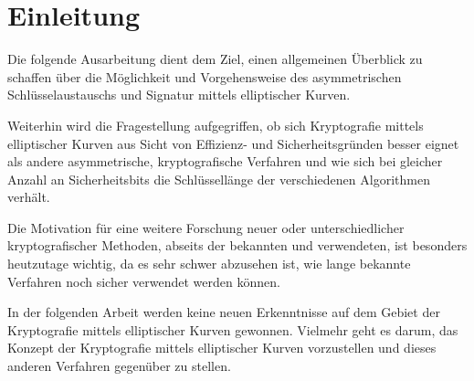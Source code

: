\chapter{Einleitung}

Die folgende Ausarbeitung dient dem Ziel, einen allgemeinen Überblick zu schaffen über 
die Möglichkeit und Vorgehensweise des asymmetrischen Schlüsselaustauschs und Signatur mittels elliptischer Kurven.

Weiterhin wird die Fragestellung aufgegriffen, ob sich Kryptografie mittels elliptischer Kurven
aus Sicht von Effizienz- und Sicherheitsgründen besser eignet als andere asymmetrische, 
kryptografische Verfahren und wie sich bei gleicher Anzahl an Sicherheitsbits die Schlüssellänge der verschiedenen Algorithmen verhält.

Die Motivation für eine weitere Forschung neuer oder unterschiedlicher kryptografischer Methoden,
abseits der bekannten und verwendeten, ist besonders heutzutage wichtig, da es sehr schwer
abzusehen ist, wie lange bekannte Verfahren noch sicher verwendet werden können.

In der folgenden Arbeit werden keine neuen Erkenntnisse auf dem Gebiet der Kryptografie mittels elliptischer Kurven gewonnen.
Vielmehr geht es darum, das Konzept der Kryptografie mittels elliptischer Kurven vorzustellen und dieses anderen Verfahren gegenüber zu stellen.

